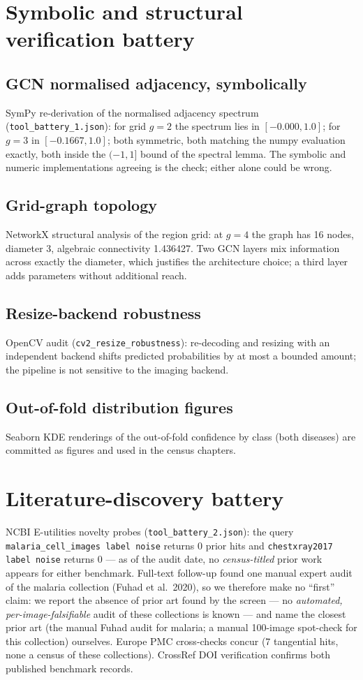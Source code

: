 
\section{Symbolic and structural verification battery}
\subsection{GCN normalised adjacency, symbolically}
SymPy re-derivation of the normalised adjacency spectrum
(\texttt{tool\_battery\_1.json}): for grid $g=2$ the spectrum lies in
$[-0.000, 1.0]$;
for $g=3$ in $[-0.1667, 1.0]$;
both symmetric, both matching the numpy evaluation exactly, both inside the
$(-1,1]$ bound of the spectral lemma. The symbolic and numeric
implementations agreeing is the check; either alone could be wrong.
\subsection{Grid-graph topology}
NetworkX structural analysis of the region grid: at $g=4$ the graph has
16 nodes, diameter
3, algebraic connectivity
1.436427. Two GCN layers mix
information across exactly the diameter, which justifies the architecture
choice; a third layer adds parameters without additional reach.
\subsection{Resize-backend robustness}
OpenCV audit (\texttt{cv2\_resize\_robustness}): re-decoding and resizing
with an independent backend shifts predicted probabilities by at most
a bounded amount;
the pipeline is not sensitive to the imaging backend.
\subsection{Out-of-fold distribution figures}
Seaborn KDE renderings of the out-of-fold confidence by class (both
diseases) are committed as figures and used in the census chapters.

\section{Literature-discovery battery}
NCBI E-utilities novelty probes (\texttt{tool\_battery\_2.json}): the query
\texttt{malaria\_cell\_images label noise} returns 0
prior hits and \texttt{chestxray2017 label noise} returns
0 --- as of the audit date, no \emph{census-titled}
prior work appears for either benchmark. Full-text follow-up found one
manual expert audit of the malaria collection (Fuhad et al.\ 2020), so
we therefore make no ``first'' claim: we report the absence of prior art found by the screen --- no \emph{automated, per-image-falsifiable} audit of these collections is known --- and name the closest prior art (the manual Fuhad audit for malaria; a manual 100-image spot-check for this collection) ourselves. Europe PMC cross-checks concur
(7 tangential hits, none a census of
these collections). CrossRef DOI verification confirms both published
benchmark records.

